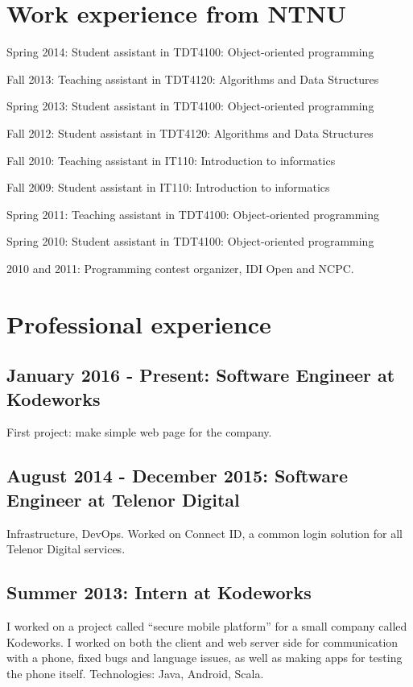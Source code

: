 \documentclass[letterpaper]{article}
\renewenvironment{itemize}{
  \begin{list}{}{
    \setlength{\leftmargin}{1.5em}
  }
}{
  \end{list}
}
\begin{document}
\section*{Work experience from NTNU}
\begin{itemize}
\item Spring 2014: Student assistant in TDT4100: Object-oriented programming
\item Fall 2013: Teaching assistant in TDT4120: Algorithms and Data
  Structures
\item Spring 2013: Student assistant in TDT4100: Object-oriented programming
\item Fall 2012: Student assistant in TDT4120: Algorithms and Data Structures

\item Fall 2010: Teaching assistant in IT110: Introduction to informatics
\item Fall 2009: Student assistant in  IT110: Introduction to informatics

\item Spring 2011: Teaching assistant in  TDT4100: Object-oriented programming
\item Spring 2010: Student assistant in  TDT4100: Object-oriented programming

\item 2010 and 2011: Programming contest organizer, IDI Open and NCPC.
\end{itemize}

\section*{Professional experience}
\subsection*{January 2016 - Present: Software Engineer at Kodeworks}
First project: make simple web page for the company.

\subsection*{August 2014 - December 2015: Software Engineer at Telenor Digital}
Infrastructure, DevOps. Worked on Connect ID, a common login solution for all Telenor Digital services.

\subsection*{Summer 2013: Intern at Kodeworks}
I worked on a project called ``secure mobile platform'' for a small company
called Kodeworks. I worked on both the client and web
server side for communication with a phone, fixed bugs and language
issues, as well as making apps for testing the phone itself. Technologies: Java, Android, Scala.
\end{document}
